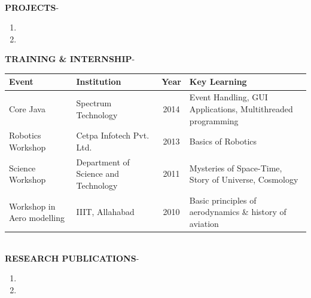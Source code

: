 \documentclass{article}
\begin{document}
	\\[\baselineskip]
	\textbf{PROJECTS}-
	\begin{enumerate}
		\item
		\item
	\end{enumerate}
	\textbf{TRAINING \& INTERNSHIP}- \\
	\begin{tabular}{|p{5cm}|p{5cm}|c|p{5cm}|}
		\hline
		\textbf{Event} & \textbf{Institution} & \textbf{Year} & \textbf{Key Learning}\\
		\hline
		Core Java & Spectrum Technology & 2014 & Event Handling, GUI Applications, Multithreaded programming \\
		\hline
		Robotics Workshop & Cetpa Infotech Pvt. Ltd. & 2013 & Basics of Robotics\\
		\hline
		Science Workshop & Department of Science and Technology & 2011 & Mysteries of Space-Time, Story of Universe, Cosmology\\
		\hline
		Workshop in Aero modelling & IIIT, Allahabad & 2010 & Basic principles of aerodynamics \& history of aviation\\
		\hline
	\end{tabular}
	\\[\baselineskip]
	\textbf{RESEARCH PUBLICATIONS}-
	\begin{enumerate}
		\item
		\item 
	\end{enumerate}
\end{document}
